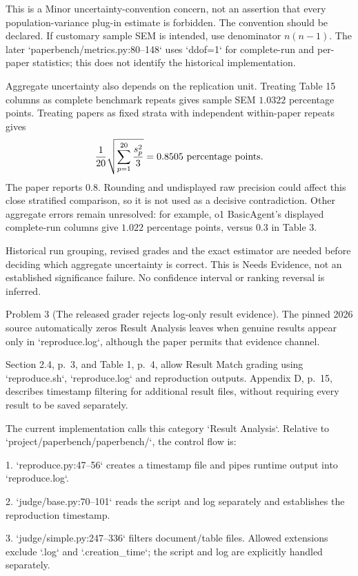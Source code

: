 \documentclass[10pt]{article}
\begin{document}
This is a Minor uncertainty-convention concern, not an assertion that every population-variance plug-in estimate is forbidden. The convention should be declared. If customary sample SEM is intended, use denominator \(n(n-1)\). The later `paperbench/metrics.py:80--148` uses `ddof=1` for complete-run and per-paper statistics; this does not identify the historical implementation.\par
Aggregate uncertainty also depends on the replication unit. Treating Table 15 columns as complete benchmark repeats gives sample SEM \(1.0322\) percentage points. Treating papers as fixed strata with independent within-paper repeats gives \[\frac1{20}\sqrt{\sum_{p=1}^{20}\frac{s_p^2}{3}}
 =0.8505\ {\rm percentage\ points}.\] The paper reports \(0.8\). Rounding and undisplayed raw precision could affect this close stratified comparison, so it is not used as a decisive contradiction. Other aggregate errors remain unresolved: for example, o1 BasicAgent’s displayed complete-run columns give \(1.022\) percentage points, versus \(0.3\) in Table 3.\par
Historical run grouping, revised grades and the exact estimator are needed before deciding which aggregate uncertainty is correct. This is Needs Evidence, not an established significance failure. No confidence interval or ranking reversal is inferred.\par
Problem 3 (The released grader rejects log-only result evidence).  The pinned 2026 source automatically zeros Result Analysis leaves when genuine results appear only in `reproduce.log`, although the paper permits that evidence channel.\par
Section 2.4, p. 3, and Table 1, p. 4, allow Result Match grading using `reproduce.sh`, `reproduce.log` and reproduction outputs. Appendix D, p. 15, describes timestamp filtering for additional result files, without requiring every result to be saved separately.\par
The current implementation calls this category `Result Analysis`. Relative to `project/paperbench/paperbench/`, the control flow is:\par
1. `reproduce.py:47--56` creates a timestamp file and pipes runtime output into `reproduce.log`.\par
2. `judge/base.py:70--101` reads the script and log separately and establishes the reproduction timestamp.\par
3. `judge/simple.py:247--336` filters document/table files. Allowed extensions exclude `.log` and `.creation\_time`; the script and log are explicitly handled separately.\par
\end{document}
